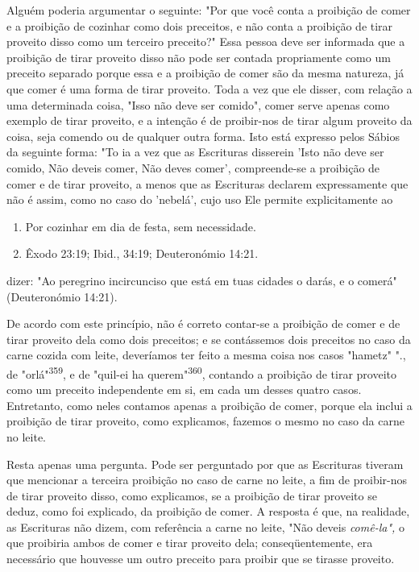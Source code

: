\begin{itemize}
\begin{enumrate}
\begin{itemize}
\begin{itemize}
\begin{itemize}
Alguém poderia argumentar o seguinte: "Por que você conta a proi­bição
de comer e a proibição de cozinhar como dois preceitos, e não conta a
proibição de tirar proveito disso como um terceiro preceito?" Essa
pessoa deve ser informada que a proibição de tirar proveito disso não
pode ser con­tada propriamente como um preceito separado porque essa e a
proibição de comer são da mesma natureza, já que comer é uma forma de
tirar proveito. Toda a vez que ele disser, com relação a uma determinada
coisa, "Isso não deve ser comido", comer serve apenas como exemplo de
tirar proveito, e a intenção é de proibir-nos de tirar algum proveito da
coisa, seja comendo ou de qualquer outra forma. Isto está expresso pelos
Sábios da seguinte for­ma: "To ia a vez que as Escrituras disserein
'Isto não deve ser comido, Não deveis comer, Não deves comer',
compreende-se a proibição de comer e de tirar proveito, a menos que as
Escrituras declarem expressamente que não é assim, como no caso do
'nebelá', cujo uso Ele permite explicitamente ao


\begin{enumerate}
\def\labelenumi{\arabic{enumi}.}
\setcounter{enumi}{355}
\item
 
 Por cozinhar em dia de festa, sem necessidade.
 
\item
 
 Êxodo 23:19; Ibid., 34:19; Deuteronómio 14:21.
 
\end{enumerate}



dizer: "Ao peregrino incircunciso que está em tuas cidades o darás, e o
come­rá" (Deuteronómio 14:21).

De acordo com este princípio, não é correto contar-se a proibição de
comer e de tirar proveito dela como dois preceitos; e se contássemos
dois preceitos no caso da carne cozida com leite, deveríamos ter feito a
mesma coi­sa nos casos "hametz" "., de
"orlá"\textsuperscript{359}, e de "quil-ei ha
querem"\textsuperscript{360}, contan­do a proibição de tirar proveito
como um preceito independente em si, em ca­da um desses quatro casos.
Entretanto, como neles contamos apenas a proibi­ção de comer, porque ela
inclui a proibição de tirar proveito, como explica­mos, fazemos o mesmo
no caso da carne no leite.

Resta apenas uma pergunta. Pode ser perguntado por que as Escritu­ras
tiveram que mencionar a terceira proibição no caso de carne no leite, a
fim de proibir-nos de tirar proveito disso, como explicamos, se a
proibição de tirar proveito se deduz, como foi explicado, da proibição
de comer. A resposta é que, na realidade, as Escrituras não dizem, com
referência a carne no leite, "Não deveis \emph{comê-la",} o que
proibiria ambos de comer e tirar proveito dela; conse­qüentemente, era
necessário que houvesse um outro preceito para proibir que se tirasse
proveito.


\end{itemize}
\end{itemize}
\end{itemize}
\end{enumrate}
\end{itemize}
